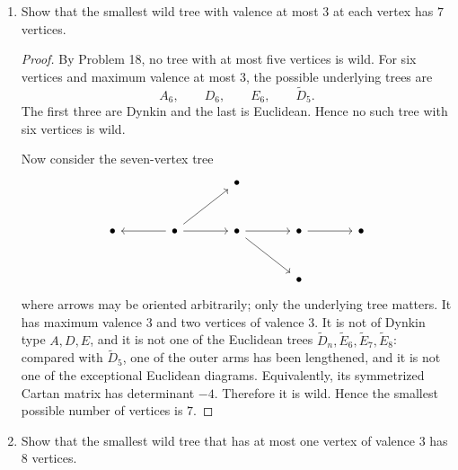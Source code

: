 \documentclass[11pt, a4paper]{article}
\begin{document}
\begin{enumerate}[leftmargin=*, label=\textbf{\arabic*.}]
\begin{proof}
The representation type depends only on the underlying graph. If a tree with at most five vertices has no branching vertex, then it is a path, hence of Dynkin type $A_n$.
If it has a branching vertex, then for $n\le5$ the only possibilities are:
\[
D_4,
\qquad
D_5,
\qquad
\widetilde D_4.
\]
Here $D_4$ and $D_5$ are Dynkin, and $\widetilde D_4$ is Euclidean. Therefore every tree quiver with $n\le5$ is Dynkin or Euclidean.
\end{proof}

\item Show that the smallest wild tree with valence at most $3$ at each vertex has $7$ vertices.

\begin{proof}
By Problem 18, no tree with at most five vertices is wild. For six vertices and maximum valence at most $3$, the possible underlying trees are
\[
A_6,
\qquad
D_6,
\qquad
E_6,
\qquad
\widetilde D_5.
\]
The first three are Dynkin and the last is Euclidean. Hence no such tree with six vertices is wild.

Now consider the seven-vertex tree
\[
\begin{tikzcd}[column sep=large,row sep=large]
&&\bullet\\
\bullet&\bullet\arrow[l]\arrow[r]\arrow[ur]&\bullet\arrow[r]\arrow[dr]&\bullet\arrow[r]&\bullet\\
&&&\bullet
\end{tikzcd}
\]
where arrows may be oriented arbitrarily; only the underlying tree matters. It has maximum valence $3$ and two vertices of valence $3$. It is not of Dynkin type $A,D,E$, and it is not one of the Euclidean trees $\widetilde D_n,\widetilde E_6,\widetilde E_7,\widetilde E_8$: compared with $\widetilde D_5$, one of the outer arms has been lengthened, and it is not one of the exceptional Euclidean diagrams. Equivalently, its symmetrized Cartan matrix has determinant $-4$. Therefore it is wild. Hence the smallest possible number of vertices is $7$.
\end{proof}

\item Show that the smallest wild tree that has at most one vertex of valence $3$ has $8$ vertices.


\end{enumerate}
\end{document}
